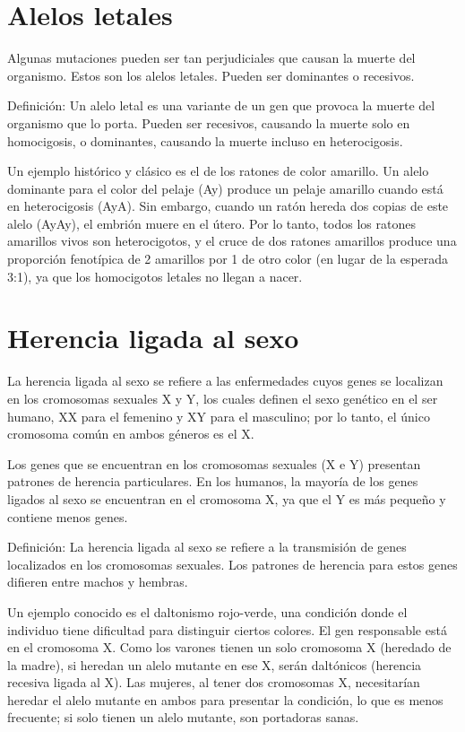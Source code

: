 \section{Alelos letales}

Algunas mutaciones pueden ser tan perjudiciales que causan la muerte del organismo. Estos son los alelos letales. Pueden ser dominantes o recesivos.

Definición: Un alelo letal es una variante de un gen que provoca la muerte del organismo que lo porta. Pueden ser recesivos, causando la muerte solo en homocigosis, o dominantes, causando la muerte incluso en heterocigosis.

Un ejemplo histórico y clásico es el de los ratones de color amarillo. Un alelo dominante para el color del pelaje (Ay) produce un pelaje amarillo cuando está en heterocigosis (AyA). Sin embargo, cuando un ratón hereda dos copias de este alelo (AyAy), el embrión muere en el útero. Por lo tanto, todos los ratones amarillos vivos son heterocigotos, y el cruce de dos ratones amarillos produce una proporción fenotípica de 2 amarillos por 1 de otro color (en lugar de la esperada 3:1), ya que los homocigotos letales no llegan a nacer.

\section{Herencia ligada al sexo}

La herencia ligada al sexo se refiere a las enfermedades cuyos genes se localizan en los cromosomas sexuales X y Y, los cuales definen el sexo genético en el ser humano, XX para el femenino y XY para el masculino; por lo tanto, el único cromosoma común en ambos géneros es el X.\citep{delcastilloruizGeneticaClinica2019}

Los genes que se encuentran en los cromosomas sexuales (X e Y) presentan patrones de herencia particulares. En los humanos, la mayoría de los genes ligados al sexo se encuentran en el cromosoma X, ya que el Y es más pequeño y contiene menos genes.

Definición: La herencia ligada al sexo se refiere a la transmisión de genes localizados en los cromosomas sexuales. Los patrones de herencia para estos genes difieren entre machos y hembras.

Un ejemplo conocido es el daltonismo rojo-verde, una condición donde el individuo tiene dificultad para distinguir ciertos colores. El gen responsable está en el cromosoma X. Como los varones tienen un solo cromosoma X (heredado de la madre), si heredan un alelo mutante en ese X, serán daltónicos (herencia recesiva ligada al X). Las mujeres, al tener dos cromosomas X, necesitarían heredar el alelo mutante en ambos para presentar la condición, lo que es menos frecuente; si solo tienen un alelo mutante, son portadoras sanas.

